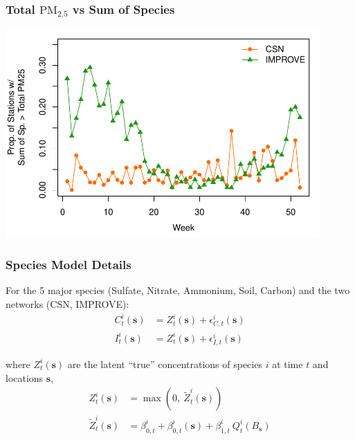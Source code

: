 \documentclass[t]{beamer}\usepackage[]{graphicx}\usepackage[]{color}
\newcommand{\PM}{$\text{PM}_{2.5}$ }
\begin{document}

\begin{frame}[t]
\frametitle{Total \PM vs Sum of Species}

\vfill

\begin{center}
\includegraphics[width=0.9\textwidth]{figs/pm_exceed.pdf}
\end{center}

\vfill
	
\end{frame}


\begin{frame}
\frametitle{Species Model Details}

For the 5 major species (Sulfate, Nitrate, Ammonium, Soil, Carbon) and the two networks (CSN, IMPROVE):
%
\begin{align*}
C_t^i(\bm{s}) &= Z_t^i(\bm{s}) + \epsilon_{C,t}^i(\bm{s}) \\
I_t^i(\bm{s}) &= Z_t^i(\bm{s}) + \epsilon_{I,t}^i(\bm{s})
\end{align*}

where $Z_t^i(\bm{s})$ are the latent ``true'' concentrations of species $i$ at time $t$ and locations $\bm{s}$,
%
\begin{align*}
{Z}_t^i(\bm{s}) &= \max{}\left(0,~\widetilde{Z}_t^i(\bm{s})\right) \\
\widetilde{Z}_t^i(\bm{s}) &= \beta_{0,t}^i +\beta_{0,t}^i(\bm{s}) + \beta_{1,t}^i \: Q_t^i(B_{\bm{s}})  
\end{align*}


\end{frame}
\end{document}
